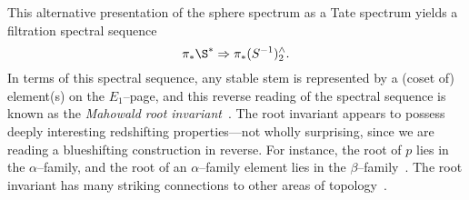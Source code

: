 This alternative presentation of the sphere spectrum as a Tate spectrum yields a filtration spectral sequence \[\pi_* \S^* \Rightarrow \pi_* (S^{-1})^\wedge_2.\]  In terms of this spectral sequence, any stable stem is represented by a (coset of) element(s) on the \(E_1\)--page, and this reverse reading of the spectral sequence is known as the \textit{Mahowald root invariant}~\cite{MahowaldShick}.  The root invariant appears to possess deeply interesting redshifting properties---not wholly surprising, since we are reading a blueshifting construction in reverse.  For instance, the root of \(p\) lies in the \(\alpha\)--family, and the root of an \(\alpha\)--family element lies in the \(\beta\)--family~\cite{BehrensRootInv}.  The root invariant has many striking connections to other areas of topology~\cite{MahowaldRavenel}.

